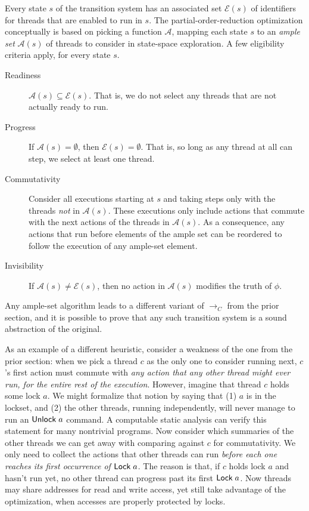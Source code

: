 \documentclass{amsbook}
\theoremstyle{definition}
\theoremstyle{remark}
\numberwithin{section}{chapter}
\numberwithin{equation}{chapter}
\begin{document}
Every state $s$ of the transition system has an associated set $\mathcal E(s)$ of identifiers for threads that are enabled to run in $s$.
The partial-order-reduction optimization conceptually is based on picking a function $\mathcal A$, mapping each state $s$ to an \emph{ample set} $\mathcal A(s)$ of threads to consider in state-space exploration.
A few eligibility criteria apply, for every state $s$.

\begin{description}
  \item[Readiness] $\mathcal A(s) \subseteq \mathcal E(s)$.  That is, we do not select any threads that are not actually ready to run.
  \item[Progress] If $\mathcal A(s) = \emptyset$, then $\mathcal E(s) = \emptyset$.  That is, so long as any thread at all can step, we select at least one thread.
  \item[Commutativity] Consider all executions starting at $s$ and taking steps only with the threads \emph{not} in $\mathcal A(s)$.  These executions only include actions that commute with the next actions of the threads in $\mathcal A(s)$.  As a consequence, any actions that run before elements of the ample set can be reordered to follow the execution of any ample-set element.
  \item[Invisibility] If $\mathcal A(s) \neq \mathcal E(s)$, then no action in $\mathcal A(s)$ modifies the truth of $\phi$.
\end{description}

Any ample-set algorithm leads to a different variant of $\to_C$ from the prior section, and it is possible to prove that any such transition system is a sound abstraction of the original.

As an example of a different heuristic, consider a weakness of the one from the prior section: when we pick a thread $c$ as the only one to consider running next, $c$'s first action must commute with \emph{any action that any other thread might ever run, for the entire rest of the execution}.
However, imagine that thread $c$ holds some lock $a$.
We might formalize that notion by saying that (1) $a$ is in the lockset, and (2) the other threads, running independently, will never manage to run an $\mathsf{Unlock} \; a$ command.
A computable static analysis can verify this statement for many nontrivial programs.
Now consider which summaries of the other threads we can get away with comparing against $c$ for commutativity.
We only need to collect the actions that other threads can run \emph{before each one reaches its first occurrence of $\mathsf{Lock} \; a$}.
The reason is that, if $c$ holds lock $a$ and hasn't run yet, no other thread can progress past its first $\mathsf{Lock} \; a$.
Now threads may share addresses for read and write access, yet still take advantage of the optimization, when accesses are properly protected by locks.
\end{document}
